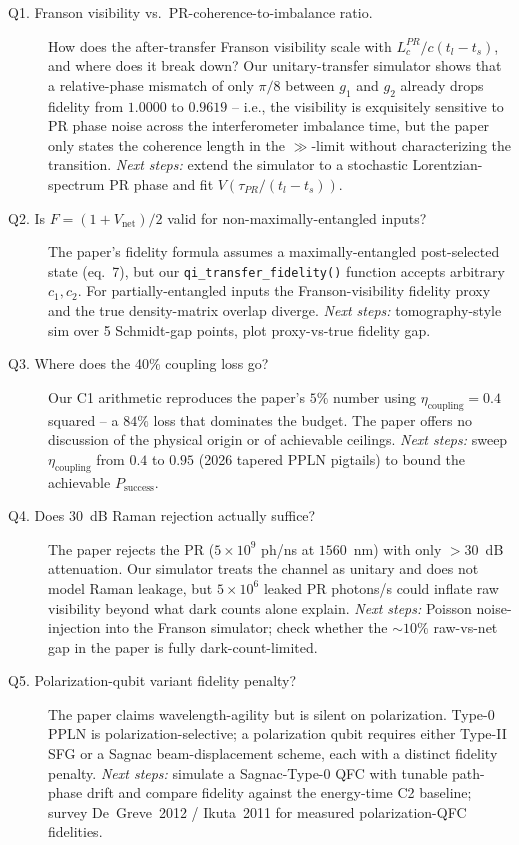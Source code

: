 \begin{description}
\item[Q1. Franson visibility vs.\ PR-coherence-to-imbalance ratio.]
How does the after-transfer Franson visibility scale with $L_c^{PR}/c(t_l-t_s)$, and where does it break down? Our unitary-transfer simulator shows that a relative-phase mismatch of only $\pi/8$ between $g_1$ and $g_2$ already drops fidelity from $1.0000$ to $0.9619$ -- i.e., the visibility is exquisitely sensitive to PR phase noise across the interferometer imbalance time, but the paper only states the coherence length in the $\gg$-limit without characterizing the transition. \emph{Next steps:} extend the simulator to a stochastic Lorentzian-spectrum PR phase and fit $V(\tau_{PR}/(t_l-t_s))$.

\item[Q2. Is $F = (1+V_{\text{net}})/2$ valid for non-maximally-entangled inputs?]
The paper's fidelity formula assumes a maximally-entangled post-selected state (eq.~7), but our \texttt{qi\_transfer\_fidelity()} function accepts arbitrary $c_1, c_2$. For partially-entangled inputs the Franson-visibility fidelity proxy and the true density-matrix overlap diverge. \emph{Next steps:} tomography-style sim over 5 Schmidt-gap points, plot proxy-vs-true fidelity gap.

\item[Q3. Where does the 40\% coupling loss go?]
Our C1 arithmetic reproduces the paper's $5\%$ number using $\eta_{\text{coupling}} = 0.4$ squared -- a $84\%$ loss that dominates the budget. The paper offers no discussion of the physical origin or of achievable ceilings. \emph{Next steps:} sweep $\eta_{\text{coupling}}$ from $0.4$ to $0.95$ (2026 tapered PPLN pigtails) to bound the achievable $P_{\text{success}}$.

\item[Q4. Does 30~dB Raman rejection actually suffice?]
The paper rejects the PR ($5\times 10^9$ ph/ns at $1560$~nm) with only $>30$~dB attenuation. Our simulator treats the channel as unitary and does not model Raman leakage, but $5\times 10^{6}$ leaked PR photons/s could inflate raw visibility beyond what dark counts alone explain. \emph{Next steps:} Poisson noise-injection into the Franson simulator; check whether the $\sim 10\%$ raw-vs-net gap in the paper is fully dark-count-limited.

\item[Q5. Polarization-qubit variant fidelity penalty?]
The paper claims wavelength-agility but is silent on polarization. Type-0 PPLN is polarization-selective; a polarization qubit requires either Type-II SFG or a Sagnac beam-displacement scheme, each with a distinct fidelity penalty. \emph{Next steps:} simulate a Sagnac-Type-0 QFC with tunable path-phase drift and compare fidelity against the energy-time C2 baseline; survey De~Greve~2012 / Ikuta~2011 for measured polarization-QFC fidelities.
\end{description}
